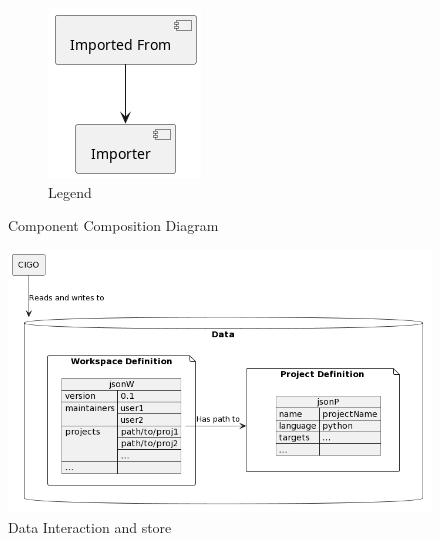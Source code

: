 \documentclass[11pt]{article}
\begin{document}
\begin{figure}[h!]
\begin{subfigure}{0.15\linewidth}
    \includegraphics[width=\linewidth]{diags/comp_legend.png}
    \caption{\label{fig:comp}Legend}
  \end{subfigure}
  \caption{Component Composition Diagram}
\end{figure}

\begin{figure}[h!]
\end{figure}

\begin{figure}[h!]
  \centering
  \includegraphics[width=0.8\linewidth]{diags/system.png}
  \caption{Data Interaction and store}
  \label{fig:storage}
\end{figure}
\end{document}
